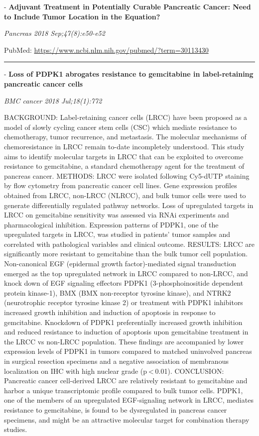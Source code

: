 \documentclass[]{article}
\begin{document}
 - \textbf{Adjuvant Treatment in Potentially Curable Pancreatic Cancer:
Need to Include Tumor Location in the Equation?}

\emph{Pancreas 2018 Sep;47(8):e50-e52}

PubMed: \url{https://www.ncbi.nlm.nih.gov/pubmed/?term=30113430}

{}

{}

\begin{center}\rule{0.5\linewidth}{\linethickness}\end{center}

 - \textbf{Loss of PDPK1 abrogates resistance to gemcitabine in
label-retaining pancreatic cancer cells}

\emph{BMC cancer 2018 Jul;18(1):772}

BACKGROUND: Label-retaining cancer cells (LRCC) have been proposed as a
model of slowly cycling cancer stem cells (CSC) which mediate resistance
to chemotherapy, tumor recurrence, and metastasis. The molecular
mechanisms of chemoresistance in LRCC remain to-date incompletely
understood. This study aims to identify molecular targets in LRCC that
can be exploited to overcome resistance to gemcitabine, a standard
chemotherapy agent for the treatment of pancreas cancer. METHODS: LRCC
were isolated following Cy5-dUTP staining by flow cytometry from
pancreatic cancer cell lines. Gene expression profiles obtained from
LRCC, non-LRCC (NLRCC), and bulk tumor cells were used to generate
differentially regulated pathway networks. Loss of upregulated targets
in LRCC on gemcitabine sensitivity was assessed via RNAi experiments and
pharmacological inhibition. Expression patterns of PDPK1, one of the
upregulated targets in LRCC, was studied in patients' tumor samples and
correlated with pathological variables and clinical outcome. RESULTS:
LRCC are significantly more resistant to gemcitabine than the bulk tumor
cell population. Non-canonical EGF (epidermal growth factor)-mediated
signal transduction emerged as the top upregulated network in LRCC
compared to non-LRCC, and knock down of EGF signaling effectors PDPK1
(3-phosphoinositide dependent protein kinase-1), BMX (BMX non-receptor
tyrosine kinase), and NTRK2 (neurotrophic receptor tyrosine kinase 2) or
treatment with PDPK1 inhibitors increased growth inhibition and
induction of apoptosis in response to gemcitabine. Knockdown of PDPK1
preferentially increased growth inhibition and reduced resistance to
induction of apoptosis upon gemcitabine treatment in the LRCC vs
non-LRCC population. These findings are accompanied by lower expression
levels of PDPK1 in tumors compared to matched uninvolved pancreas in
surgical resection specimens and a negative association of membranous
localization on IHC with high nuclear grade (p \textless{} 0.01).
CONCLUSION: Pancreatic cancer cell-derived LRCC are relatively resistant
to gemcitabine and harbor a unique transcriptomic profile compared to
bulk tumor cells. PDPK1, one of the members of an upregulated
EGF-signaling network in LRCC, mediates resistance to gemcitabine, is
found to be dysregulated in pancreas cancer specimens, and might be an
attractive molecular target for combination therapy studies.
\end{document}
